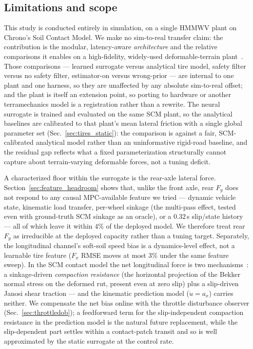 \documentclass[conference,letterpaper,10pt]{IEEEtran}
\begin{document}
\subsection{Limitations and scope}
\label{sec:limitations}
This study is conducted entirely in simulation, on a single HMMWV plant
on Chrono's Soil Contact Model. We make no sim-to-real transfer claim:
the contribution is the modular, latency-aware \emph{architecture} and
the relative comparisons it enables on a high-fidelity, widely-used
deformable-terrain plant~\cite{Krenn09,Tasora16}. Those comparisons ---
learned surrogate versus analytical tire model, safety filter versus no safety filter,
estimator-on versus wrong-prior --- are internal to one plant and one
harness, so they are unaffected by any absolute sim-to-real offset; and
the plant is itself an extension point, so porting to hardware or another
terramechanics model is a registration rather than a rewrite. The
neural surrogate is trained and evaluated on the same SCM plant, so the
analytical baselines are calibrated to that plant's mean lateral
friction with a single global parameter set
(Sec.~\ref{sec:tires_static}): the comparison is against a fair,
SCM-calibrated analytical model rather than an uninformative rigid-road baseline, and
the residual gap reflects what a fixed parameterization structurally
cannot capture about terrain-varying deformable forces, not a tuning
deficit.

A characterized floor within the surrogate is the rear-axle lateral
force. Section~\ref{sec:feature_headroom} shows that, unlike the front
axle, rear $F_y$ does not respond to any causal MPC-available feature we
tried --- dynamic vehicle state, kinematic load transfer, per-wheel
sinkage (the multi-pass effect, tested even with ground-truth SCM
sinkage as an oracle), or a $0.32$\,s slip/state history --- all of
which leave it within $4\%$ of the deployed model. We therefore treat
rear $F_y$ as irreducible at the deployed capacity rather than a tuning
target. Separately, the longitudinal channel's soft-soil speed bias is a
dynamics-level effect, not a learnable tire feature ($F_x$ RMSE moves at
most $3\%$ under the same feature sweep). In the SCM contact model the
net longitudinal force is two mechanisms~\cite{Krenn09}: a sinkage-driven
\emph{compaction resistance} (the horizontal projection of the Bekker
normal stress on the deformed rut, present even at zero slip) plus a
slip-driven Janosi shear traction --- and the kinematic prediction model
($\dot u\!=\!a_x$) carries neither. We compensate the net bias online with
the throttle disturbance observer (Sec.~\ref{sec:throttledob}); a
feedforward term for the slip-independent compaction resistance in the
prediction model is the natural future replacement, while the
slip-dependent part settles within a contact-patch transit and so is
well approximated by the static surrogate at the control rate.
\end{document}
